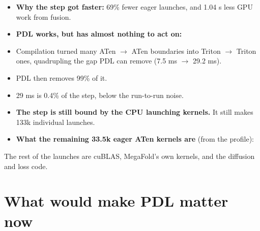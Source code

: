 \documentclass[10pt]{article}
\begin{document}
\begin{itemize}
\item \textbf{Why the step got faster:} 69\% fewer eager launches, and 1.04 s less GPU work from fusion.
\item \textbf{PDL works, but has almost nothing to act on:}
\item Compilation turned many ATen $\rightarrow$ ATen boundaries into Triton $\rightarrow$ Triton ones, quadrupling the gap PDL can remove (7.5 ms $\rightarrow$ 29.2 ms).
\item PDL then removes 99\% of it.
\item 29 ms is 0.4\% of the step, below the run-to-run noise.
\item \textbf{The step is still bound by the CPU launching kernels.} It still makes 133k individual launches.
\item \textbf{What the remaining 33.5k eager ATen kernels are} (from the profile):
\end{itemize}

\begin{table}[H]\centering\small
{}
\end{table}

The rest of the launches are cuBLAS, MegaFold's own kernels, and the diffusion and loss code.


\section{What would make PDL matter now}
\end{document}

